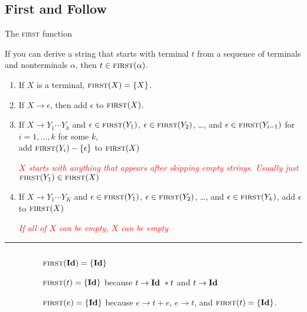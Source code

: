 \documentclass{plt}
\begin{document}
\subsection{First and Follow}

\newcommand\first{\textsc{first}}
\newcommand\follow{\textsc{follow}}

\begin{frame}{The \first{} function}

\parskip=5pt

If you can derive a string that starts with terminal $t$ from a
sequence of terminals and nonterminals $\alpha$, then $t \in
\first(\alpha)$.

\begin{enumerate}
\item If $X$ is a terminal, $\first(X) = \{ X \}$.

\item If $X \rightarrow \epsilon$, then add $\epsilon$ to $\first(X)$.

\item If $X \rightarrow Y_1 \cdots Y_k$ and
  $\epsilon \in \first(Y_1)$,
  $\epsilon \in \first(Y_2)$, \ldots, and $\epsilon \in
  \first(Y_{i-1})$ for $i=1,\ldots, k$ for some $k$, \\ \quad add
  $\first(Y_i) - \{ \epsilon \}$ to $\first(X)$

    \textcolor{red}{\emph{$X$ starts with anything that appears after
      skipping empty strings. Usually just $\first(Y_1) \in \first(X)$}}

\item If $X \rightarrow Y_1 \cdots Y_K$ and
  $\epsilon \in \first(Y_1)$,
  $\epsilon \in \first(Y_2)$, \ldots, and $\epsilon \in \first(Y_k)$, add
  $\epsilon$ to $\first(X)$

    \textcolor{red}{\emph{If all of $X$ can be empty, $X$ can be empty}}  
\end{enumerate}

\hrule

\vspace{5pt}

\begin{columns}
\begin{column}{0.3\textwidth}
\grammarone
\end{column}
\begin{column}{0.7\textwidth}
\parskip=5pt
$\first(\id) = \{ \id \}$

$\first(t) = \{ \id \}$ because $t \rightarrow \textbf{Id}\ * t$ and $t
  \rightarrow \textbf{Id}$

$\first(e) = \{ \id \}$ because $e \rightarrow t + e$, $e \rightarrow
  t$, and $\first(t) = \{ \id \}$.

\end{column}
\end{columns}

\end{frame}
\end{document}
